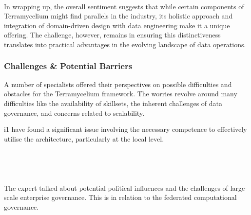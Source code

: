\documentclass[review]{elsarticle}
\begin{document}
\,

In wrapping up, the overall sentiment suggests that while certain components of Terramycelium might find parallels in the industry, its holistic approach and integration of domain-driven design with data engineering make it a unique offering. The challenge, however, remains in ensuring this distinctiveness translates into practical advantages in the evolving landscape of data operations.

\subsubsection{Challenges \& Potential Barriers}

A number of specialists offered their perspectives on possible difficulties and obstacles for the Terramycelium framework. The worries revolve around many difficulties like the availability of skillsets, the inherent challenges of data governance, and concerns related to scalability.

i1 have found a significant issue involving the necessary competence to effectively utilise the architecture, particularly at the local level.

\,

\setlength{\fboxsep}{0.3em}

\noindent{}

\,

The expert talked about potential political influences and the challenges of large-scale enterprise governance. This is in relation to the federated computational governance.

\,

\setlength{\fboxsep}{0.3em}

\noindent{}
\end{document}

